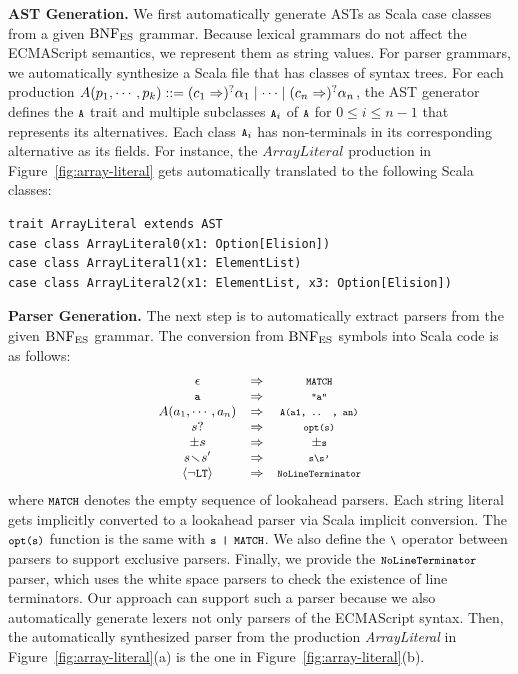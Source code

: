 \textbf{AST Generation.}
We first automatically generate ASTs as Scala case classes from a
given \( \text{BNF}_{\text{ES}} \) grammar.  Because lexical grammars do not affect
the ECMAScript semantics, we represent them as string values.
For parser grammars, we automatically synthesize a Scala file that has
classes of syntax trees.  For each production \(
  A(p_1, \cdots, p_k) ::=
  (c_1 \Rightarrow)^? \alpha_1 \mid
  \cdots \mid
  (c_n \Rightarrow)^? \alpha_n
\), the AST generator defines the \( \texttt{\footnotesize A} \) trait and multiple
subclasses \( \texttt{\footnotesize A}_i \) of \( \texttt{\footnotesize A} \) for \(0 \le i \le n-1\)
that represents its alternatives.  Each class \( \texttt{\footnotesize A}_i \) has
non-terminals in its corresponding alternative as its fields.
For instance, the \( ArrayLiteral \) production in Figure~\ref{fig:array-literal}
gets automatically translated to the following Scala classes:
\begin{lstlisting}[style=smallScalastyle]
trait ArrayLiteral extends AST
case class ArrayLiteral0(x1: Option[Elision])
case class ArrayLiteral1(x1: ElementList)
case class ArrayLiteral2(x1: ElementList, x3: Option[Elision])
\end{lstlisting}

\smallskip

\textbf{Parser Generation.}
The next step is to automatically extract parsers from the given \(
\text{BNF}_{\text{ES}} \) grammar.  The conversion from \( \text{BNF}_{\text{ES}} \) symbols into
Scala code is as follows:
\[
\small
  \begin{array}{ccc}
    \epsilon &\Rightarrow& \texttt{\scriptsize MATCH}\\
    \texttt{\footnotesize a} &\Rightarrow& \texttt{\scriptsize"a"}\\
    A(a_1, \cdots, a_n) &\Rightarrow& \texttt{\scriptsize A(a1, .. , an)}\\
    s? &\Rightarrow& \texttt{\scriptsize opt(s)}\\
    \pm s &\Rightarrow& \pm\texttt{\scriptsize s} \\
    s \!\smallsetminus\! s' &\Rightarrow& \texttt{\scriptsize s\textbackslash s'}\\
    \left<\neg\texttt{\footnotesize LT}\right> &\Rightarrow& \texttt{\scriptsize NoLineTerminator}\\
  \end{array}
\]
where \( \texttt{\footnotesize MATCH} \) denotes the empty sequence of lookahead parsers.
Each string literal gets implicitly converted to a lookahead parser via
Scala implicit conversion.  The \( \texttt{\footnotesize opt(s)} \) function is the
same with \( \texttt{\footnotesize s | MATCH} \).  We also define the \( \texttt{\footnotesize\textbackslash} \) 
operator between parsers to support exclusive parsers.
Finally, we provide the \( \texttt{\footnotesize NoLineTerminator} \) parser, which uses
the white space parsers to check the existence of line terminators.
Our approach can support such a parser because we also automatically
generate lexers not only parsers of the ECMAScript syntax.  Then, the 
automatically synthesized parser from the production \textit{ArrayLiteral}
in Figure~\ref{fig:array-literal}(a) is the one in Figure~\ref{fig:array-literal}(b).

